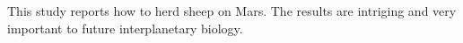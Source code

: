 This study reports how to herd sheep on Mars. The results are intriging and very important to future interplanetary biology.
